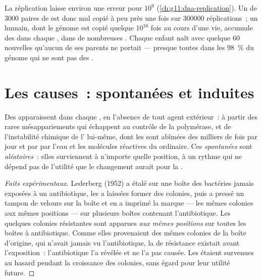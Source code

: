 \begin{example}\label{ex:g11:mutations:frequency}
La réplication laisse environ une erreur pour $10^9$ 
(\cref{ch:g11:dna-replication}). Un  de $\num{3000}$ paires de
 est donc mal copié à peu près une fois sur $\num{300000}$
réplications~; un humain, dont le génome est copié quelque $10^{16}$
fois au cours d'une vie, accumule des  dans chaque , dans
de nombreuses . Chaque enfant naît avec quelque 60 
nouvelles qu'aucun de ses parents ne portait --- presque toutes dans
les 98~\% du génome qui ne sont pas des .
\end{example}

\section{Les causes~: spontanées et induites}

\begin{proposition}\label{prop:g11:mutations:spontaneous}
Des  apparaissent dans chaque , en l'absence de tout
agent extérieur~: à partir des rares mésappariements qui échappent au
contrôle de la polymérase, et de l'instabilité chimique de l'
lui-même, dont les  sont abîmées des milliers de fois par jour et
par  par l'eau et les molécules réactives du 
ordinaire. Ces \emph{ spontanées} sont \emph{aléatoires}~:
elles surviennent à n'importe quelle position, à un rythme qui ne
dépend pas de l'utilité que le changement aurait pour la .
\end{proposition}
\begin{proof}[Faits expérimentaux]
Lederberg (1952) a étalé sur une boîte des bactéries jamais exposées à
un antibiotique, les a laissées former des colonies, puis a pressé un
tampon de velours sur la boîte et en a imprimé la marque --- les mêmes
colonies aux mêmes positions --- sur plusieurs boîtes contenant
l'antibiotique. Les quelques colonies résistantes sont apparues
\emph{aux mêmes positions} sur toutes les boîtes à antibiotique. Comme
elles provenaient des mêmes colonies de la boîte d'origine, qui
n'avait jamais vu l'antibiotique, la  de résistance existait
avant l'exposition~: l'antibiotique l'a révélée et ne l'a pas causée.
Les  étaient survenues au hasard pendant la croissance des
colonies, sans égard pour leur utilité future.
\end{proof}

